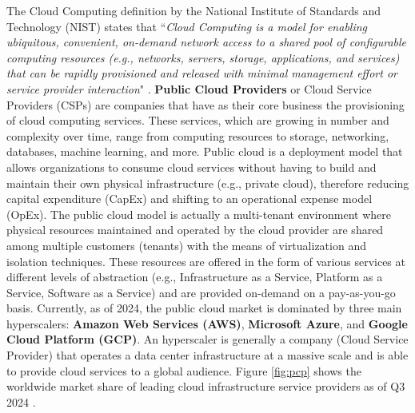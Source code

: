 The Cloud Computing definition by the National Institute of Standards and Technology (NIST) \cite{nist_cloud_computing} states that ``\textit{Cloud Computing is a model for enabling ubiquitous, convenient, on-demand network access to a shared pool of configurable computing resources (e.g., networks, servers, storage, applications, and services) that can be rapidly provisioned and released with minimal management effort or service provider interaction}" \cite{nist_cloud_computing}.
\textbf{Public Cloud Providers} or Cloud Service Providers (CSPs) are companies that have as their core business the provisioning of cloud computing services. 
These services, which are growing in number and complexity over time, range from computing resources to storage, networking, databases, machine learning, and more. 
Public cloud is a deployment model that allows organizations to consume cloud services without having to build and maintain their own physical infrastructure (e.g., private cloud), therefore reducing capital expenditure (CapEx) and shifting to an operational expense model (OpEx). 
The public cloud model is actually a multi-tenant environment where physical resources maintained and operated by the cloud provider are shared among multiple customers (tenants) with the means of virtualization and isolation techniques.
These resources are offered in the form of various services at different levels of abstraction (e.g., Infrastructure as a Service, Platform as a Service, Software as a Service) and are provided on-demand on a pay-as-you-go basis.
Currently, as of 2024, the public cloud market is dominated by three main hyperscalers: \textbf{Amazon Web Services (AWS)}, \textbf{Microsoft Azure}, and \textbf{Google Cloud Platform (GCP)}.
An hyperscaler is generally a company (Cloud Service Provider) that operates a data center infrastructure at a massive scale and is able to provide cloud services to a global audience.
Figure \ref{fig:pcp} shows the worldwide market share of leading cloud infrastructure service providers as of Q3 2024 \cite{statista_cloud_market_share}.

